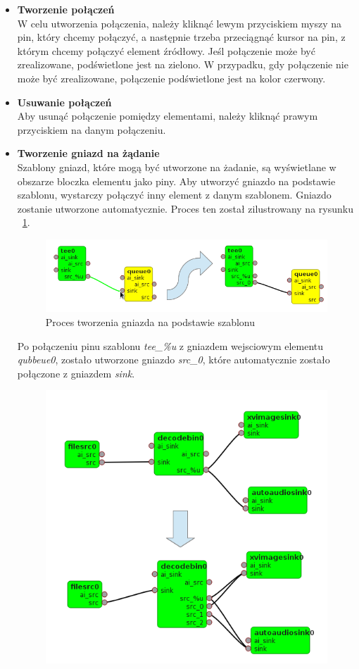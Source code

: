 \documentclass[12pt]{article}
\begin{document}
\begin{itemize}
\item \textbf{Tworzenie połączeń} \\
W celu utworzenia połączenia, należy kliknąć lewym przyciskiem myszy na pin, który chcemy połączyć, a następnie trzeba przeciągnąć kursor na pin, z którym chcemy połączyć element źródłowy. Jeśl połączenie może być zrealizowane, podświetlone jest na zielono. W przypadku, gdy połączenie nie może być zrealizowane, połączenie podświetlone jest na kolor czerwony.
\item \textbf{Usuwanie połączeń} \\ 
Aby usunąć połączenie pomiędzy elementami, należy kliknąć prawym przyciskiem na danym połączeniu.
\item \textbf{Tworzenie gniazd na żądanie} \\
Szablony gniazd, które mogą być utworzone na żadanie, są wyświetlane w obszarze bloczka elementu jako piny. Aby utworzyć gniazdo na podstawie szablonu, wystarczy połączyć inny element z danym szablonem. Gniazdo zostanie utworzone automatycznie. Proces ten został zilustrowany na rysunku ~\ref{fig:onRequestPad}.
\begin{figure}[H]
  \includegraphics[width=14cm]{img/on-request-pad.png}
  \caption{Proces tworzenia gniazda na podstawie szablonu}
  \label{fig:onRequestPad}
\end{figure}
Po połączeniu pinu szablonu \textit{tee\_\%u} z gniazdem wejsciowym elementu \textit{qubbeue0}, zostało utworzone gniazdo \textit{src\_0}, które automatycznie zostało połączone z gniazdem \textit{sink}.
\begin{figure}[H]
  \includegraphics[width=14cm]{img/future-connections.png}

\end{figure}
\end{itemize}
\end{document}
